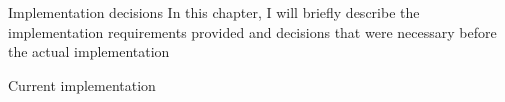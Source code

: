 \chap Implementation decisions
In this chapter, I will briefly describe the implementation requirements provided and decisions that were necessary before the actual implementation

\sec Current implementation